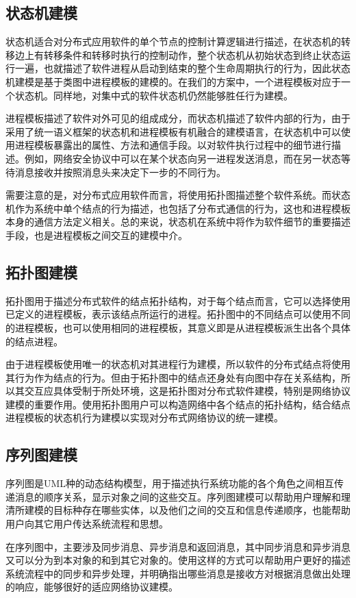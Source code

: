\subsection{状态机建模}
状态机适合对分布式应用软件的单个节点的控制计算逻辑进行描述，在状态机的转移边上有转移条件和转移时执行的控制动作，整个状态机从初始状态到终止状态运行一遍，也就描述了软件进程从启动到结束的整个生命周期执行的行为，因此状态机建模是基于类图中进程模板的建模的。在我们的方案中，一个进程模板对应于一个状态机。同样地，对集中式的软件状态机仍然能够胜任行为建模。
\par
进程模板描述了软件对外可见的组成成分，而状态机描述了软件内部的行为，由于采用了统一语义框架的状态机和进程模板有机融合的建模语言，在状态机中可以使用进程模板暴露出的属性、方法和通信手段。以对软件执行过程中的细节进行描述。例如，网络安全协议中可以在某个状态向另一进程发送消息，而在另一状态等待消息接收并按照消息头来决定下一步的不同行为。
\par
需要注意的是，对分布式应用软件而言，将使用拓扑图描述整个软件系统。而状态机作为系统中单个结点的行为描述，也包括了分布式通信的行为，这也和进程模板本身的通信方法定义相关。总的来说，状态机在系统中将作为软件细节的重要描述手段，也是进程模板之间交互的建模中介。

\subsection{拓扑图建模}
拓扑图用于描述分布式软件的结点拓扑结构，对于每个结点而言，它可以选择使用已定义的进程模板，表示该结点所运行的进程。拓扑图中的不同结点可以使用不同的进程模板，也可以使用相同的进程模板，其意义即是从进程模板派生出各个具体的结点进程。
\par
由于进程模板使用唯一的状态机对其进程行为建模，所以软件的分布式结点将使用其行为作为结点的行为。但由于拓扑图中的结点还身处有向图中存在关系结构，所以其交互应具体受制于所处环境，这是拓扑图对分布式软件建模，特别是网络协议建模的重要作用。使用拓扑图用户可以构造网络中各个结点的拓扑结构，结合结点进程模板的状态机行为建模以实现对分布式网络协议的统一建模。

\subsection{序列图建模}
序列图是UML种的动态结构模型，用于描述执行系统功能的各个角色之间相互传递消息的顺序关系，显示对象之间的这些交互。序列图建模可以帮助用户理解和理清所建模的目标种存在哪些实体，以及他们之间的交互和信息传递顺序，也能帮助用户向其它用户传达系统流程和思想。
\par
在序列图中，主要涉及同步消息、异步消息和返回消息，其中同步消息和异步消息又可以分为到本对象的和到其它对象的。使用这样的方式可以帮助用户更好的描述系统流程中的同步和异步处理，并明确指出哪些消息是接收方对根据消息做出处理的响应，能够很好的适应网络协议建模。


